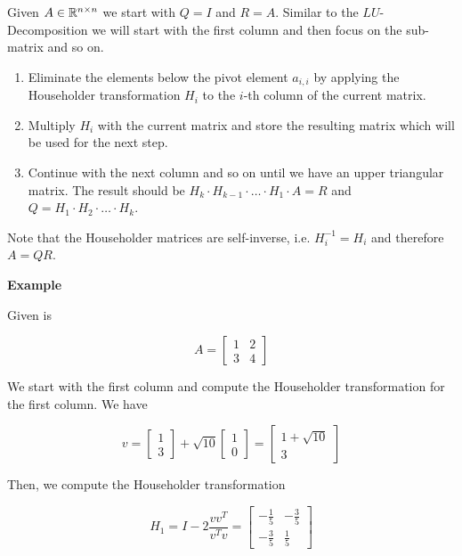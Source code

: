 Given \(A \in \mathbb{R}^{n \times n}\) we start with \(Q = I\) and \(R = A\).
Similar to the \(LU\)-Decomposition we will start with the first column and then focus on the sub-matrix and so on.

\begin{enumerate}

    \item Eliminate the elements below the pivot element \(a_{i,i}\) by applying the Householder transformation \(H_i\) to the \(i\)-th column of the current matrix.

    \item Multiply \(H_i\) with the current matrix and store the resulting matrix which will be used for the next step.

    \item Continue with the next column and so on until we have an upper triangular matrix. The result should be \(H_k \cdot H_{k - 1} \cdot \dots \cdot H_1 \cdot A = R\) and \(Q = H_1 \cdot H_2 \cdot \dots \cdot H_k\).
 
\end{enumerate}

Note that the Householder matrices are self-inverse, i.e. \(H_i^{-1} = H_i\) and therefore \(A = Q R\).

\textbf{Example}

Given is  

\[
    A = 
    \begin{bmatrix}
        1 & 2 \\ 
        3 & 4
    \end{bmatrix}
\]

We start with the first column and compute the Householder transformation for the first column. We have

\[
    v = 
    \begin{bmatrix}
        1 \\ 
        3
    \end{bmatrix}
    + \sqrt{10} 
    \begin{bmatrix}
        1 \\ 
        0
    \end{bmatrix}
    =
    \begin{bmatrix}
        1 + \sqrt{10} \\ 
        3
    \end{bmatrix}
\]

Then, we compute the Householder transformation

\[
    H_1 = I - 2 \frac{vv^T}{v^Tv} = 
    \begin{bmatrix}
        -\frac{1}{5} & -\frac{3}{5} \\ 
        -\frac{3}{5} & \frac{1}{5}
    \end{bmatrix}
\]

